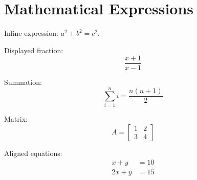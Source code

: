\documentclass{article}
\begin{document}
\section{Mathematical Expressions}

Inline expression: \(a^2+b^2=c^2\).

Displayed fraction:
\[
\frac{x+1}{x-1}
\]

Summation:
\[
\sum_{i=1}^{n} i = \frac{n(n+1)}{2}
\]

Matrix:
\[
A =
\begin{bmatrix}
1 & 2 \\
3 & 4
\end{bmatrix}
\]

Aligned equations:
\begin{align}
x+y &= 10 \\
2x+y &= 15
\end{align}
\end{document}
